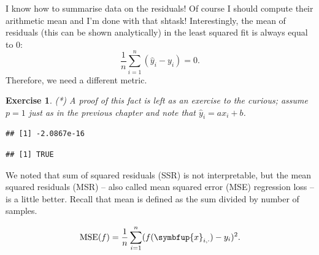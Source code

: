 \documentclass[10pt,b5paper,krantz1]{krantz}
\newenvironment{Shaded}{\begin{snugshade}}{\end{snugshade}}
\newcommand{\CommentTok}[1]{\textcolor[rgb]{0.37,0.37,0.37}{\textit{#1}}}
\newcommand{\DecValTok}[1]{\textcolor[rgb]{0.06,0.06,0.06}{#1}}
\newcommand{\KeywordTok}[1]{\textcolor[rgb]{0.27,0.27,0.27}{\textbf{#1}}}
\newcommand{\NormalTok}[1]{#1}
\newcommand{\OperatorTok}[1]{\textcolor[rgb]{0.43,0.43,0.43}{\textbf{#1}}}
\newtheorem{exercise}{Exercise}[chapter]
\renewcommand{\mathbf}[1]{\symbfup{#1}}
\begin{document}
I know how to summarise data on the residuals!
Of course I should compute their arithmetic mean and I'm done with that shtask!
Interestingly, the mean of residuals (this can be shown analytically)
in the least squared fit is always equal to \(0\):
\[
 \frac{1}{n} \sum_{i=1}^n (\hat{y}_i-y_i)=0.
\]
Therefore, we need a different metric.

\begin{exercise}

(*) A proof of this fact is left as an exercise to the curious;
assume \(p=1\) just as in the previous chapter and note that \(\hat{y}_i=a x_i+b\).

\end{exercise}

\begin{Shaded}
\end{Shaded}

\begin{verbatim}
## [1] -2.0867e-16
\end{verbatim}

\begin{Shaded}
\end{Shaded}

\begin{verbatim}
## [1] TRUE
\end{verbatim}

We noted that sum of squared residuals (SSR) is not interpretable,
but the mean squared residuals
(MSR) -- also called mean squared error (MSE) regression loss -- is a little better.
Recall that mean is defined as the sum divided by number of samples.

\[
 \mathrm{MSE}(f) = \frac{1}{n} \sum_{i=1}^n (f(\mathbf{x}_{i,\cdot})-y_i)^2.
\]

\begin{Shaded}
\end{Shaded}
\end{document}
